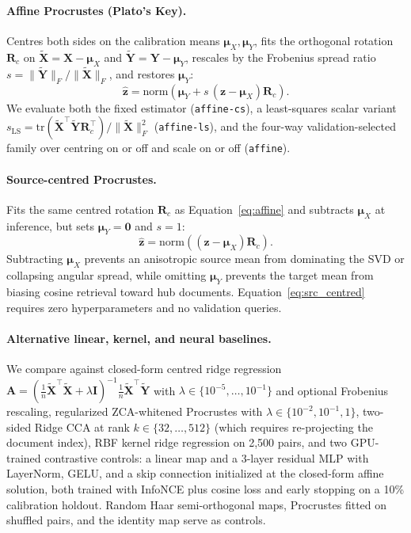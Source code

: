 \documentclass{article}
\begin{document}
\paragraph{Affine Procrustes (Plato's Key).} Centres both sides on the calibration means $\boldsymbol{\mu}_X,\boldsymbol{\mu}_Y$, fits the orthogonal rotation $\mathbf{R}_c$ on $\tilde{\mathbf{X}}=\mathbf{X}-\boldsymbol{\mu}_X$ and $\tilde{\mathbf{Y}}=\mathbf{Y}-\boldsymbol{\mu}_Y$, rescales by the Frobenius spread ratio $s=\lVert\tilde{\mathbf{Y}}\rVert_F/\lVert\tilde{\mathbf{X}}\rVert_F$, and restores $\boldsymbol{\mu}_Y$:
\begin{equation}
\hat{\mathbf{z}} = \mathrm{norm}\!\left(\boldsymbol{\mu}_Y + s\,(\mathbf{z}-\boldsymbol{\mu}_X)\mathbf{R}_c\right).
\label{eq:affine}
\end{equation}
We evaluate both the fixed estimator (\texttt{affine-cs}), a least-squares scalar variant $s_{\mathrm{LS}}=\mathrm{tr}(\tilde{\mathbf{X}}^\top\tilde{\mathbf{Y}}\mathbf{R}_c^\top)/\lVert\tilde{\mathbf{X}}\rVert_F^2$ (\texttt{affine-ls}), and the four-way validation-selected family over centring on or off and scale on or off (\texttt{affine}).

\paragraph{Source-centred Procrustes.} Fits the same centred rotation $\mathbf{R}_c$ as Equation~\eqref{eq:affine} and subtracts $\boldsymbol{\mu}_X$ at inference, but sets $\boldsymbol{\mu}_Y=\mathbf{0}$ and $s=1$:
\begin{equation}
\hat{\mathbf{z}} = \mathrm{norm}\!\left((\mathbf{z}-\boldsymbol{\mu}_X)\mathbf{R}_c\right).
\label{eq:src_centred}
\end{equation}
Subtracting $\boldsymbol{\mu}_X$ prevents an anisotropic source mean from dominating the SVD or collapsing angular spread, while omitting $\boldsymbol{\mu}_Y$ prevents the target mean from biasing cosine retrieval toward hub documents. Equation~\eqref{eq:src_centred} requires zero hyperparameters and no validation queries.

\paragraph{Alternative linear, kernel, and neural baselines.} We compare against closed-form centred ridge regression $\mathbf{A}=(\frac{1}{n}\tilde{\mathbf{X}}^\top\tilde{\mathbf{X}}+\lambda\mathbf{I})^{-1}\frac{1}{n}\tilde{\mathbf{X}}^\top\tilde{\mathbf{Y}}$ with $\lambda\in\{10^{-5},\dots,10^{-1}\}$ and optional Frobenius rescaling, regularized ZCA-whitened Procrustes with $\lambda\in\{10^{-2},10^{-1},1\}$, two-sided Ridge CCA at rank $k\in\{32,\dots,512\}$ (which requires re-projecting the document index), RBF kernel ridge regression on 2{,}500 pairs, and two GPU-trained contrastive controls: a linear map and a 3-layer residual MLP with LayerNorm, GELU, and a skip connection initialized at the closed-form affine solution, both trained with InfoNCE plus cosine loss and early stopping on a 10\% calibration holdout. Random Haar semi-orthogonal maps, Procrustes fitted on shuffled pairs, and the identity map serve as controls.
\end{document}

